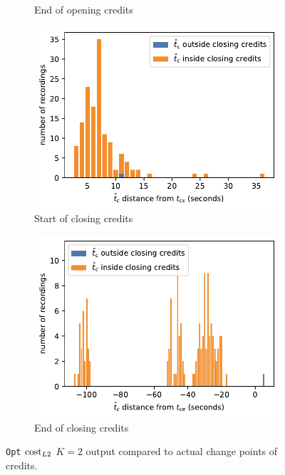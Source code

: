 \begin{figure}[h]
\begin{subfigure}[t]{.49\textwidth}
    \caption{End of opening credits}
    \label{fig:t_diff_opt_oe}
  \end{subfigure}
  \begin{subfigure}[t]{.49\textwidth}
      \centering
      \includegraphics[width=\linewidth]{../plots/distances/opt_l2_dist_end_first.pdf}
      \caption{Start of closing credits}
      \label{fig:t_diff_opt_cs}
    \end{subfigure}
    \begin{subfigure}[t]{.49\textwidth}
      \centering
      \includegraphics[width=\linewidth]{../plots/distances/opt_l2_dist_end_last.pdf}
      \caption{End of closing credits}
      \label{fig:t_diff_opt_ce}
    \end{subfigure}
  \caption{\texttt{Opt} $\operatorname{cost}_{L2}$ $K=2$ output compared to actual change points of credits.}
  \label{fig:t_diff_opt_credits}
\end{figure}

